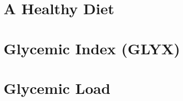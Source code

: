 \documentclass[../main.tex]{subfiles}
\begin{document}
%

%


%

%


\chapter{A Healthy Diet}


\chapter{Glycemic Index (GLYX)}



\chapter{Glycemic Load}



\end{document}
